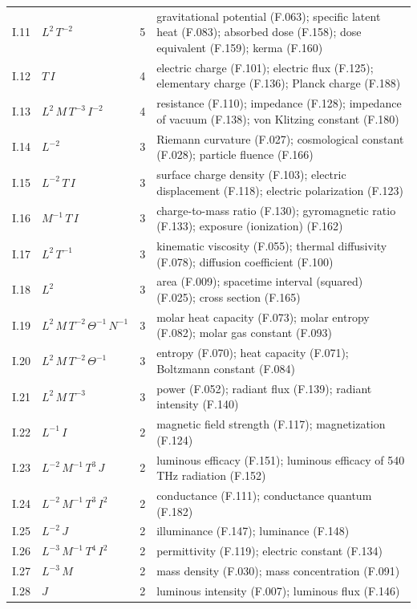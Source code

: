 {\begin{longtable}{@{}llr>{\raggedright\arraybackslash}p{11.6cm}@{}}
I.11 & $L^{2}\,T^{-2}$ & 5 & gravitational potential (F.063); specific latent heat (F.083); absorbed dose (F.158); dose equivalent (F.159); kerma (F.160) \\
I.12 & $T\,I$ & 4 & electric charge (F.101); electric flux (F.125); elementary charge (F.136); Planck charge (F.188) \\
I.13 & $L^{2}\,M\,T^{-3}\,I^{-2}$ & 4 & resistance (F.110); impedance (F.128); impedance of vacuum (F.138); von Klitzing constant (F.180) \\
I.14 & $L^{-2}$ & 3 & Riemann curvature (F.027); cosmological constant (F.028); particle fluence (F.166) \\
I.15 & $L^{-2}\,T\,I$ & 3 & surface charge density (F.103); electric displacement (F.118); electric polarization (F.123) \\
I.16 & $M^{-1}\,T\,I$ & 3 & charge-to-mass ratio (F.130); gyromagnetic ratio (F.133); exposure (ionization) (F.162) \\
I.17 & $L^{2}\,T^{-1}$ & 3 & kinematic viscosity (F.055); thermal diffusivity (F.078); diffusion coefficient (F.100) \\
I.18 & $L^{2}$ & 3 & area (F.009); spacetime interval (squared) (F.025); cross section (F.165) \\
I.19 & $L^{2}\,M\,T^{-2}\,\Theta^{-1}\,N^{-1}$ & 3 & molar heat capacity (F.073); molar entropy (F.082); molar gas constant (F.093) \\
I.20 & $L^{2}\,M\,T^{-2}\,\Theta^{-1}$ & 3 & entropy (F.070); heat capacity (F.071); Boltzmann constant (F.084) \\
I.21 & $L^{2}\,M\,T^{-3}$ & 3 & power (F.052); radiant flux (F.139); radiant intensity (F.140) \\
I.22 & $L^{-1}\,I$ & 2 & magnetic field strength (F.117); magnetization (F.124) \\
I.23 & $L^{-2}\,M^{-1}\,T^{3}\,J$ & 2 & luminous efficacy (F.151); luminous efficacy of 540 THz radiation (F.152) \\
I.24 & $L^{-2}\,M^{-1}\,T^{3}\,I^{2}$ & 2 & conductance (F.111); conductance quantum (F.182) \\
I.25 & $L^{-2}\,J$ & 2 & illuminance (F.147); luminance (F.148) \\
I.26 & $L^{-3}\,M^{-1}\,T^{4}\,I^{2}$ & 2 & permittivity (F.119); electric constant (F.134) \\
I.27 & $L^{-3}\,M$ & 2 & mass density (F.030); mass concentration (F.091) \\
I.28 & $J$ & 2 & luminous intensity (F.007); luminous flux (F.146) \\

\end{longtable}}

